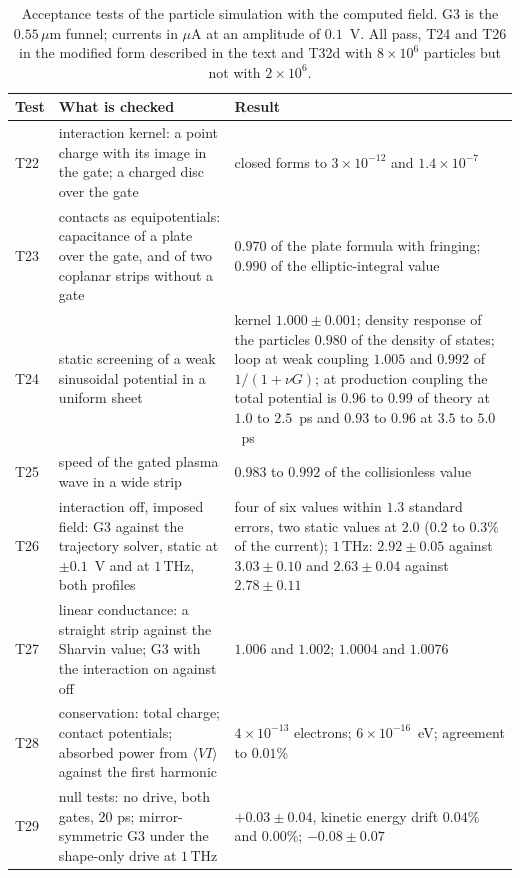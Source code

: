 \documentclass[aps,prapplied,onecolumn,superscriptaddress,floatfix]{revtex4-2}
\newcommand{\um}{\,\mu\mathrm{m}}
\newcommand{\THz}{\,\mathrm{THz}}
\begin{document}
\begin{table}[ht]
\caption{Acceptance tests of the particle simulation with the computed
field. G3 is the $0.55\um$ funnel; currents in $\mu$A at an amplitude of
$0.1$~V. All pass, T24 and T26 in the modified form described in the
text and T32d with $8\times10^{6}$ particles but not with
$2\times10^{6}$.}
\begin{ruledtabular}
\begin{tabular}{lp{}p{}}
Test & What is checked & Result \\
\hline
T22 & interaction kernel: a point charge with its image in the gate; a charged disc over the gate & closed forms to $3\times10^{-12}$ and $1.4\times10^{-7}$ \\
T23 & contacts as equipotentials: capacitance of a plate over the gate, and of two coplanar strips without a gate & $0.970$ of the plate formula with fringing; $0.990$ of the elliptic-integral value \\
T24 & static screening of a weak sinusoidal potential in a uniform sheet & kernel $1.000\pm0.001$; density response of the particles $0.980$ of the density of states; loop at weak coupling $1.005$ and $0.992$ of $1/(1+\nu G)$; at production coupling the total potential is $0.96$ to $0.99$ of theory at $1.0$ to $2.5$~ps and $0.93$ to $0.96$ at $3.5$ to $5.0$~ps \\
T25 & speed of the gated plasma wave in a wide strip & $0.983$ to $0.992$ of the collisionless value \\
T26 & interaction off, imposed field: G3 against the trajectory solver, static at $\pm0.1$~V and at $1\THz$, both profiles & four of six values within $1.3$ standard errors, two static values at $2.0$ ($0.2$ to $0.3\%$ of the current); $1\THz$: $2.92\pm0.05$ against $3.03\pm0.10$ and $2.63\pm0.04$ against $2.78\pm0.11$ \\
T27 & linear conductance: a straight strip against the Sharvin value; G3 with the interaction on against off & $1.006$ and $1.002$; $1.0004$ and $1.0076$ \\
T28 & conservation: total charge; contact potentials; absorbed power from $\langle VI\rangle$ against the first harmonic & $4\times10^{-13}$ electrons; $6\times10^{-16}$~eV; agreement to $0.01\%$ \\
T29 & null tests: no drive, both gates, 20 ps; mirror-symmetric G3 under the shape-only drive at $1\THz$ & $+0.03\pm0.04$, kinetic energy drift $0.04\%$ and $0.00\%$; $-0.08\pm0.07$ \\

\end{tabular}
\end{ruledtabular}
\end{table}
\end{document}
